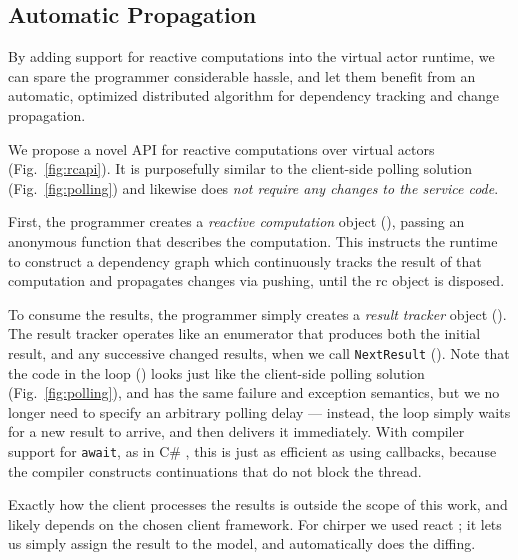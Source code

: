 \subsection{Automatic Propagation}\label{sec:reactive}

By adding support for reactive computations into the virtual actor runtime, we can spare the programmer considerable hassle, and let them benefit from an automatic, optimized distributed algorithm for dependency tracking and change propagation. 

We propose a novel API for reactive computations over virtual actors (Fig.~\ref{fig:rcapi}). It is purposefully similar to the client-side polling solution (Fig.~\ref{fig:polling}) and likewise does \emph{not require any changes to the service code}. 

First, the programmer creates a \emph{reactive computation} object (), passing an anonymous function that describes the computation. This instructs the runtime to construct a dependency graph which continuously tracks the result of that computation and propagates changes via pushing, until the rc object is disposed.

To consume the results, the programmer simply creates a \emph{result tracker} object (). The result tracker operates like an enumerator that produces both the initial result, and any successive changed results, when we call \lstinline|NextResult| (). %
Note that the code in the loop () looks just like the client-side polling solution (Fig.~\ref{fig:polling}), and has the same failure and exception semantics, but we no longer need to specify an arbitrary polling delay --- instead, the loop simply waits for a new result to arrive, and then delivers it immediately. With compiler support for \lstinline|await|, as in C\# \cite{Bierman2012}, this is just as efficient as using callbacks, because the compiler constructs continuations that do not block the thread.

Exactly how the client processes the results is outside the scope of this work, and likely depends on the chosen client framework. For chirper  we used react \cite{react}; it lets us simply assign the result to the model, and automatically does the diffing.


 
